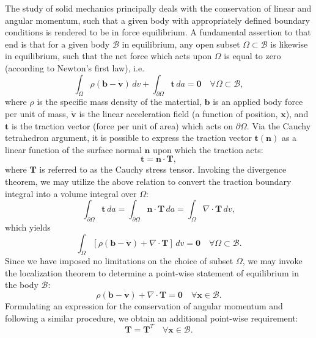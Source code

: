 The study of solid mechanics principally deals with the conservation of linear and angular momentum, such that a given body with appropriately defined boundary conditions is rendered to be in force equilibrium. A fundamental assertion to that end is that for a given body $\mathcal{B}$ in equilibrium, any open subset $\Omega \subset \mathcal{B}$ is likewise in equilibrium, such that the net force which acts upon $\Omega$ is equal to zero (according to Newton's first law), i.e.
\begin{equation}
  \int_{\Omega} \rho (\mathbf{b} - \dot{\mathbf{v}}) \, dv + \int_{\partial \Omega} \mathbf{t} \, da = \mathbf{0} \quad \forall \Omega \subset \mathcal{B},
\end{equation}
where $\rho$ is the specific mass density of the matertial, $\mathbf{b}$ is an applied body force per unit of mass, $\dot{\mathbf{v}}$ is the linear acceleration field (a function of position, $\mathbf{x}$), and $\mathbf{t}$ is the traction vector (force per unit of area) which acts on $\partial \Omega$. Via the Cauchy tetrahedron argument, it is possible to express the traction vector $\mathbf{t} (\mathbf{n})$ as a linear function of the surface normal $\mathbf{n}$ upon which the traction acts:
\begin{equation}
  \mathbf{t} = \mathbf{n} \cdot \mathbf{T},
\end{equation}
where $\mathbf{T}$ is referred to as the Cauchy stress tensor. Invoking the divergence theorem, we may utilize the above relation to convert the traction boundary integral into a volume integral over $\Omega$:
\begin{equation}
  \int_{\partial \Omega} \mathbf{t} \, da = \int_{\partial \Omega} \mathbf{n} \cdot \mathbf{T} \, da = \int_{\Omega} \nabla \cdot \mathbf{T} \, dv,
\end{equation}
which yields
\begin{equation}
  \int_{\Omega} \left[ \rho (\mathbf{b} - \dot{\mathbf{v}}) + \nabla \cdot \mathbf{T} \right] \, dv = \mathbf{0} \quad \forall \Omega \subset \mathcal{B}.
\end{equation}
Since we have imposed no limitations on the choice of subset $\Omega$, we may invoke the localization theorem to determine a point-wise statement of equilibrium in the body $\mathcal{B}$:
\begin{equation}
  \rho (\mathbf{b} - \dot{\mathbf{v}}) + \nabla \cdot \mathbf{T} = \mathbf{0} \quad \forall \mathbf{x} \in \mathcal{B}.
\end{equation}
Formulating an expression for the conservation of angular momentum and following a similar procedure, we obtain an additional point-wise requirement:
\begin{equation}
  \mathbf{T} = \mathbf{T}^T \quad \forall \mathbf{x} \in \mathcal{B}.
\end{equation}

